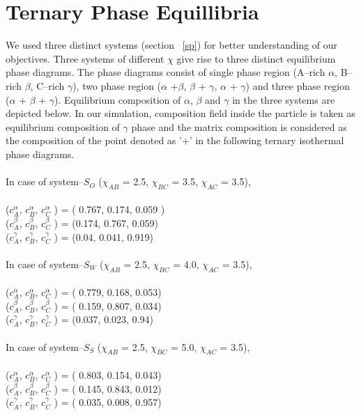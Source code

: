 \documentclass[12pt]{iiscthes}
\theoremstyle{definition}
\theoremstyle{definition}
\theoremstyle{remark}
\begin{document}
\section{Ternary Phase Equillibria}\label{tpe}
We used three distinct systems (section ~\ref{sp}) for better understanding of our objectives. Three systems of different $\chi$ give rise to three distinct equilibrium phase diagrams. The phase diagrams consist of single phase region (A--rich $\alpha$, B--rich $\beta$, C--rich $\gamma$), two phase region ($\alpha$ +$\beta$, $\beta$ + $\gamma$, $\alpha$ + $\gamma$) and three phase region ($\alpha$ + $\beta$ + $\gamma$). Equilibrium composition of $\alpha$, $\beta$ and $\gamma$ in the three systems are depicted below. In our simulation, composition field inside the particle is taken as equilibrium composition of $\gamma$ phase and the matrix composition is considered as the composition of the point denoted as  '+' in the following ternary isothermal phase diagrams. \\ \\
In case of system--$S_O$ ($\chi_{AB}$ = 2.5, $\chi_{BC}$ = 3.5, $\chi_{AC}$ = 3.5), \\ \\
($c_A^\alpha$, $c_B^\alpha$, $c_C^\alpha$ ) = ( 0.767, 0.174, 0.059 )\\
($c_A^\beta$, $c_B^\beta$, $c_C^\beta$ ) = (0.174, 0.767, 0.059)\\
($c_A^\gamma$, $c_B^\gamma$, $c_C^\gamma$ ) = (0.04, 0.041, 0.919)\\ \\
In case of system--$S_W$ ($\chi_{AB}$ = 2.5, $\chi_{BC}$ = 4.0, $\chi_{AC}$ = 3.5), \\ \\
($c_A^\alpha$, $c_B^\alpha$, $c_C^\alpha$ ) = ( 0.779, 0.168, 0.053)\\
($c_A^\beta$, $c_B^\beta$, $c_C^\beta$ ) = ( 0.159, 0.807, 0.034)\\
($c_A^\gamma$, $c_B^\gamma$, $c_C^\gamma$ ) = (0.037, 0.023, 0.94)\\ \\
In case of system--$S_S$ ($\chi_{AB}$ = 2.5, $\chi_{BC}$ = 5.0, $\chi_{AC}$ = 3.5), \\ \\
($c_A^\alpha$, $c_B^\alpha$, $c_C^\alpha$ ) = ( 0.803, 0.154, 0.043)\\
($c_A^\beta$, $c_B^\beta$, $c_C^\beta$ ) = ( 0.145, 0.843, 0.012)\\
($c_A^\gamma$, $c_B^\gamma$, $c_C^\gamma$ ) = ( 0.035, 0.008, 0.957)\\ \\
\end{document}
